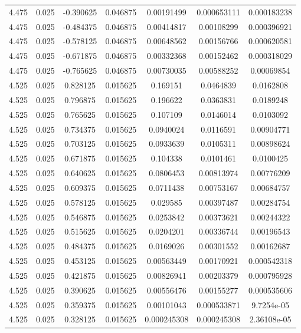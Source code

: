 \begin{flushleft}
\begin{longtable}{ccccccc}
4.475 & 0.025 & -0.390625 & 0.046875 & 0.00191499 & 0.000653111 & 0.000183238  \\ 
4.475 & 0.025 & -0.484375 & 0.046875 & 0.00414817 & 0.00108299 & 0.000396921  \\ 
4.475 & 0.025 & -0.578125 & 0.046875 & 0.00648562 & 0.00156766 & 0.000620581  \\ 
4.475 & 0.025 & -0.671875 & 0.046875 & 0.00332368 & 0.00152462 & 0.000318029  \\ 
4.475 & 0.025 & -0.765625 & 0.046875 & 0.00730035 & 0.00588252 & 0.00069854  \\ 
4.525 & 0.025 & 0.828125 & 0.015625 & 0.169151 & 0.0464839 & 0.0162808  \\ 
4.525 & 0.025 & 0.796875 & 0.015625 & 0.196622 & 0.0363831 & 0.0189248  \\ 
4.525 & 0.025 & 0.765625 & 0.015625 & 0.107109 & 0.0146014 & 0.0103092  \\ 
4.525 & 0.025 & 0.734375 & 0.015625 & 0.0940024 & 0.0116591 & 0.00904771  \\ 
4.525 & 0.025 & 0.703125 & 0.015625 & 0.0933639 & 0.0105311 & 0.00898624  \\ 
4.525 & 0.025 & 0.671875 & 0.015625 & 0.104338 & 0.0101461 & 0.0100425  \\ 
4.525 & 0.025 & 0.640625 & 0.015625 & 0.0806453 & 0.00813974 & 0.00776209  \\ 
4.525 & 0.025 & 0.609375 & 0.015625 & 0.0711438 & 0.00753167 & 0.00684757  \\ 
4.525 & 0.025 & 0.578125 & 0.015625 & 0.029585 & 0.00397487 & 0.00284754  \\ 
4.525 & 0.025 & 0.546875 & 0.015625 & 0.0253842 & 0.00373621 & 0.00244322  \\ 
4.525 & 0.025 & 0.515625 & 0.015625 & 0.0204201 & 0.00336744 & 0.00196543  \\ 
4.525 & 0.025 & 0.484375 & 0.015625 & 0.0169026 & 0.00301552 & 0.00162687  \\ 
4.525 & 0.025 & 0.453125 & 0.015625 & 0.00563449 & 0.00170921 & 0.000542318  \\ 
4.525 & 0.025 & 0.421875 & 0.015625 & 0.00826941 & 0.00203379 & 0.000795928  \\ 
4.525 & 0.025 & 0.390625 & 0.015625 & 0.00556476 & 0.00155277 & 0.000535606  \\ 
4.525 & 0.025 & 0.359375 & 0.015625 & 0.00101043 & 0.000533871 & 9.7254e-05  \\ 
4.525 & 0.025 & 0.328125 & 0.015625 & 0.000245308 & 0.000245308 & 2.36108e-05  \\ 

\end{longtable}
\end{flushleft}

